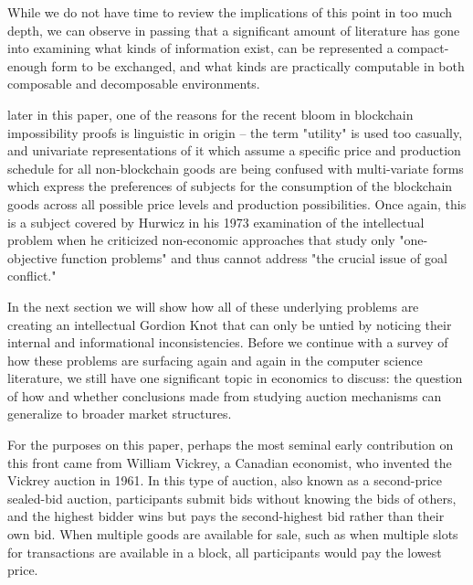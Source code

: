 \documentclass[sigconf,anonymous]{aamas}
\begin{document}
While we do not have time to review the implications of this point in too much depth, we can observe in passing that a significant amount of literature has gone into examining what kinds of information exist, can be represented a compact-enough form to be exchanged, and what kinds are practically computable in both composable and decomposable environments. 















 later in this paper, one of the reasons for the recent bloom in blockchain impossibility proofs is linguistic in origin -- the term "utility" is used too casually, and univariate representations of it which assume a specific price and production schedule for all non-blockchain goods are being confused with multi-variate forms which express the preferences of subjects for the consumption of the blockchain goods across all possible price levels and production possibilities. Once again, this is a subject covered by Hurwicz in his 1973 examination of the intellectual problem when he criticized non-economic approaches that study only "one-objective function problems" and thus cannot address "the crucial issue of goal conflict."

In the next section we will show how all of these underlying problems are creating an intellectual Gordion Knot that can only be untied by noticing their internal and informational inconsistencies. Before we continue with a survey of how these problems are surfacing again and again in the computer science literature, we still have one significant topic in economics to discuss: the question of how and whether conclusions made from studying auction mechanisms can generalize to broader market structures.

For the purposes on this paper, perhaps the most seminal early contribution on this front came from William Vickrey, a Canadian economist, who invented the Vickrey auction in 1961. In this type of auction, also known as a second-price sealed-bid auction, participants submit bids without knowing the bids of others, and the highest bidder wins but pays the second-highest bid rather than their own bid. When multiple goods are available for sale, such as when multiple slots for transactions are available in a block, all participants would pay the lowest price.
\end{document}
